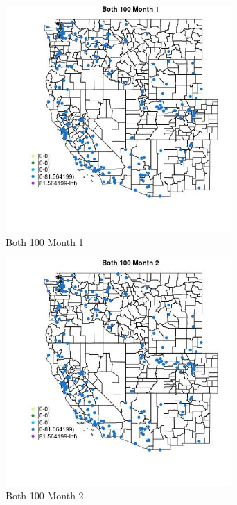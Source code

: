 \begin{figure} 
\centering  
\includegraphics[width=0.77\textwidth]{Code_Outputs/Report_ML_input_PM25_Step4_part_e_de_duplicated_aveswNAs_MapObsMo1Both_100.jpg} 
\caption{\label{fig:Report_ML_input_PM25_Step4_part_e_de_duplicated_aveswNAsMapObsMo1Both_100}Both 100 Month 1} 
\end{figure} 
 

\begin{figure} 
\centering  
\includegraphics[width=0.77\textwidth]{Code_Outputs/Report_ML_input_PM25_Step4_part_e_de_duplicated_aveswNAs_MapObsMo2Both_100.jpg} 
\caption{\label{fig:Report_ML_input_PM25_Step4_part_e_de_duplicated_aveswNAsMapObsMo2Both_100}Both 100 Month 2} 
\end{figure} 
 

